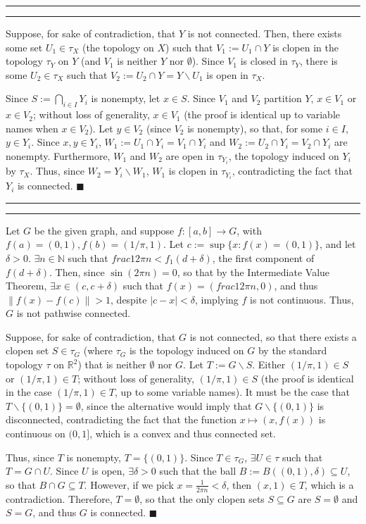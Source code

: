 \documentclass[11pt]{article}
\newcounter{questionCounter}
\newcounter{partCounter}[questionCounter]
\newenvironment{question}[2][\arabic{questionCounter}]{%
    \setcounter{partCounter}{0}%
    \vspace{.25in} \hrule \vspace{0.5em}%
        \noindent{\bf #2}%
    \vspace{0.8em} \hrule \vspace{.10in}%
    \addtocounter{questionCounter}{1}%
}{}
\renewcommand{\qed}{\quad $\blacksquare$}
\newcommand{\sminus}{\backslash}
\newcommand{\N}{\mathbb{N}} %
\newcommand{\R}{\mathbb{R}} %
\begin{document}
\begin{question}{Problem 6}
Suppose, for sake of contradiction, that $Y$ is not connected. Then, there
exists some set $U_1 \in \tau_X$ (the topology on $X$) such that
$V_1 := U_1 \cap Y$ is clopen in the topology $\tau_Y$ on $Y$ (and $V_1$ is
neither $Y$ nor $\emptyset$). Since $V_1$ is closed in $\tau_Y$, there is some
$U_2 \in \tau_X$ such that $V_2 := U_2 \cap Y = Y \sminus U_1$ is open in
$\tau_X$.

Since $S := \bigcap_{i \in I} Y_i$ is nonempty, let $x \in S$. Since $V_1$ and
$V_2$ partition $Y$, $x \in V_1$ or $x \in V_2$; without loss of generality,
$x \in V_1$ (the proof is identical up to variable names when $x \in V_2$).
Let $y \in V_2$ (since $V_2$ is nonempty), so that, for some $i \in I$,
$y \in Y_i$. Since $x,y \in Y_i$, $W_1 := U_1 \cap Y_i = V_1 \cap Y_i$ and
$W_2 := U_2 \cap Y_i = V_2 \cap Y_i$ are nonempty. Furthermore, $W_1$ and
$W_2$ are open in $\tau_{Y_i}$, the topology induced on $Y_i$ by $\tau_X$.
Thus, since $W_2 = Y_i \sminus W_1$, $W_1$ is clopen in $\tau_{Y_i}$,
contradicting the fact that $Y_i$ is connected. \qed
\end{question}

\begin{question}{Problem 7}
Let $G$ be the given graph, and suppose $f:[a,b] \rightarrow G$, with
$f(a) = (0,1), f(b) = (1/\pi, 1)$.
Let $c := \sup \{x : f(x) = (0,1)\}$, and let $\delta > 0$. $\exists n \in \N$
such that $frac{1}{2\pi n} < f_1(d + \delta)$, the first component of
$f(d + \delta)$. Then, since $\sin(2\pi n) = 0$, so that by the Intermediate
Value Theorem, $\exists x \in (c,c + \delta)$ such that
$f(x) = (frac{1}{2\pi n}, 0)$, and thus $\|f(x) - f(c)\| > 1$, despite
$|c - x| < \delta$, implying $f$ is not continuous. Thus, $G$ is not pathwise
connected.

Suppose, for sake of contradiction, that $G$ is not connected, so that there
exists a clopen set $S \in \tau_G$ (where $\tau_G$ is the topology induced on
$G$ by the standard topology $\tau$ on $\R^2$) that is neither $\emptyset$ nor
$G$. Let $T := G \sminus S$. Either $(1/\pi, 1) \in S$ or $(1/\pi,1) \in T$;
without loss of generality, $(1/\pi, 1) \in S$ (the proof is identical in the
case $(1/\pi, 1) \in T$, up to some variable names). It must be the case that
$T \sminus \{(0,1)\} = \emptyset$, since the alternative would imply that
$G\sminus\{(0,1)\}$ is disconnected, contradicting the fact that the function
$x \mapsto (x,f(x))$ is continuous on $(0,1]$, which is a convex and thus
connected set.

Thus, since $T$ is nonempty, $T = \{(0,1)\}$. Since $T \in \tau_G$,
$\exists U \in \tau$ such that $T = G \cap U$. Since $U$ is open,
$\exists \delta > 0$ such that the ball $B := B((0,1),\delta) \subseteq U$,
so that $B \cap G \subseteq T$. However, if we pick
$x = \frac{1}{2\pi n} < \delta$, then $(x,1) \in T$, which is a contradiction.
Therefore, $T = \emptyset$, so that the only clopen sets $S \subseteq G$ are
$S = \emptyset$ and $S = G$, and thus $G$ is connected. \qed

\end{question}
\end{document}
